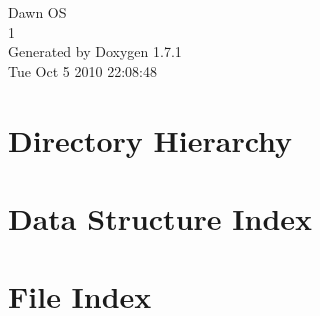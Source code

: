 \documentclass[a4paper]{book}
\begin{document}
\hypersetup{pageanchor=false}
\begin{titlepage}
\vspace*{7cm}
\begin{center}
{\Large Dawn OS \\[1ex]\large 1 }\\
\vspace*{1cm}
{\large Generated by Doxygen 1.7.1}\\
\vspace*{0.5cm}
{\small Tue Oct 5 2010 22:08:48}\\
\end{center}
\end{titlepage}
\clearemptydoublepage
{}
\tableofcontents
\clearemptydoublepage
{}
\hypersetup{pageanchor=true}
\chapter{Directory Hierarchy}

\chapter{Data Structure Index}

\chapter{File Index}

\end{document}
